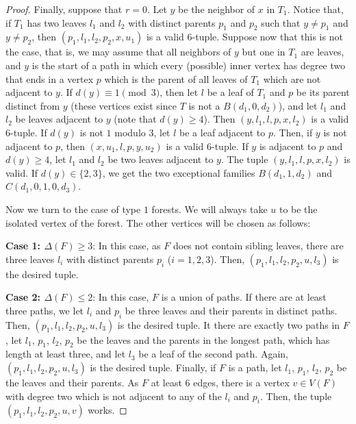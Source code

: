 \documentclass[11pt]{article}
\begin{document}
\begin{proof}
    Finally, suppose that $r=0$. Let $y$ be the neighbor of $x$ in $T_1$. Notice that, if $T_1$ has two leaves $l_1$ and $l_2$ with distinct parents $p_1$ and $p_2$ such that $y \neq p_1$ and $y \neq p_2$, then $(p_1,l_1,l_2,p_2,x,u_1)$ is a valid $6$-tuple. Suppose now that this is not the case, that is, we may assume that all neighbors of $y$ but one in $T_1$ are leaves, and $y$ is the start of a path in which every (possible) inner vertex has degree two that ends in a vertex $p$ which is the parent of all leaves of $T_1$ which are not adjacent to $y$. If $d(y) \equiv 1 \pmod 3$, then let $l$ be a leaf of $T_1$ and $p$ be its parent distinct from $y$ (these vertices exist since $T$ is not a $B(d_1,0,d_2)$), and let $l_1$ and $l_2$ be leaves adjacent to $y$ (note that $d(y) \geq 4$). Then $(y,l_1,l,p, x,l_2)$ is a valid $6$-tuple. If $d(y)$ is not $1$ modulo $3$, let $l$ be a leaf adjacent to $p$. Then, if $y$ is not adjacent to $p$, then $(x,u_1,l,p,y,u_2)$ is a valid $6$-tuple. If $y$ is adjacent to $p$ and $d(y) \geq 4$, let $l_1$ and $l_2$ be two leaves adjacent to $y$. The tuple $(y,l_1,l,p,x,l_2)$ is valid. If $d(y) \in \{2,3\}$, we get the two exceptional families $B(d_1,1,d_2)$ and $C(d_1,0,1,0,d_3)$.

    \medskip

    Now we turn to the case of type $1$ forests. We will always take $u$ to be the isolated vertex of the forest. The other vertices will be chosen as follows:

    \textbf{Case 1: $\Delta(F) \geq 3$}: In this case, as $F$ does not contain sibling leaves, there are three leaves $l_i$ with distinct parents $p_i$ ($i=1,2,3$). Then, $(p_1,l_1,l_2,p_2,u,l_3)$ is the desired tuple.

    \textbf{Case 2: $\Delta(F) \leq 2$}: In this case, $F$ is a union of paths. If there are at least three paths, we let $l_i$ and $p_i$ be three leaves and their parents in distinct paths. Then, $(p_1,l_1,l_2,p_2,u,l_3)$ is the desired tuple. It there are exactly two paths in $F$, let $l_1$, $p_1$, $l_2$, $p_2$ be the leaves and the parents in the longest path, which has length at least three, and let $l_3$ be a leaf of the second path. Again, $(p_1,l_1,l_2,p_2,u,l_3)$ is the desired tuple. Finally, if $F$ is a path, let $l_1$, $p_1$, $l_2$, $p_2$ be the leaves and their parents. As $F$ at least $6$ edges, there is a vertex $v \in V(F)$ with degree two which is not adjacent to any of the $l_i$ and $p_i$. Then, the tuple $(p_1,l_1,l_2,p_2,u,v)$ works.
    
\end{proof}
\end{document}
